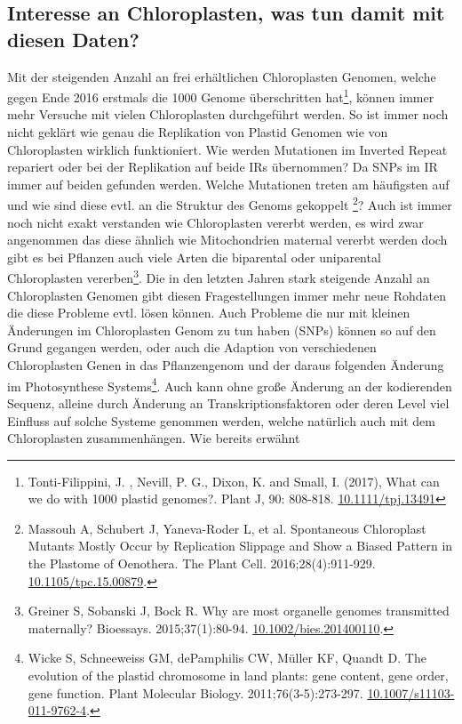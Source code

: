 \documentclass{scrartcl}
\begin{document}
\subsection{Interesse an Chloroplasten, was tun damit mit diesen Daten?}
\label{sec-2-6}
Mit der steigenden Anzahl an frei erhältlichen Chloroplasten Genomen, welche gegen Ende 2016 erstmals die 1000 Genome überschritten hat\footnote{Tonti-Filippini, J. , Nevill, P. G., Dixon, K. and Small, I. (2017), What can we do with 1000 plastid genomes?. Plant J, 90: 808-818. \url{10.1111/tpj.13491}}, können immer mehr Versuche mit vielen Chloroplasten durchgeführt werden.
So ist immer noch nicht geklärt wie genau die Replikation von Plastid Genomen wie von Chloroplasten wirklich funktioniert. Wie werden Mutationen im Inverted Repeat repariert oder bei der Replikation auf beide IRs übernommen?
Da SNPs im IR immer auf beiden gefunden werden. Welche Mutationen treten am häufigsten auf und wie sind diese evtl. an die Struktur des Genoms gekoppelt \footnote{Massouh A, Schubert J, Yaneva-Roder L, et al. Spontaneous Chloroplast Mutants Mostly Occur by Replication Slippage and Show a Biased Pattern in the Plastome of Oenothera. The Plant Cell. 2016;28(4):911-929. \url{10.1105/tpc.15.00879}.}? Auch ist immer noch nicht exakt verstanden wie Chloroplasten
vererbt werden, es wird zwar angenommen das diese ähnlich wie Mitochondrien maternal vererbt werden doch gibt es bei Pflanzen auch viele Arten die biparental oder uniparental Chloroplasten vererben\footnote{Greiner S, Sobanski J, Bock R. Why are most organelle genomes transmitted maternally? Bioessays. 2015;37(1):80-94. \url{10.1002/bies.201400110}.}. Die in den letzten 
Jahren stark steigende Anzahl an Chloroplasten Genomen gibt diesen Fragestellungen immer mehr neue Rohdaten die diese Probleme evtl. lösen können. Auch Probleme die nur mit kleinen Änderungen im Chloroplasten Genom zu tun 
haben (SNPs)
können so auf den Grund gegangen werden, oder auch die Adaption von verschiedenen Chloroplasten Genen in das Pflanzengenom und der daraus folgenden Änderung im Photosynthese Systems\footnote{Wicke S, Schneeweiss GM, dePamphilis CW, Müller KF, Quandt D. The evolution of the plastid chromosome in land plants: gene content, gene order, gene function. Plant Molecular Biology. 2011;76(3-5):273-297. \url{10.1007/s11103-011-9762-4}.}. Auch kann ohne große Änderung an der
kodierenden Sequenz, alleine durch Änderung an Transkriptionsfaktoren oder deren Level viel Einfluss auf solche Systeme genommen werden, welche natürlich auch mit dem Chloroplasten zusammenhängen\footnotemark[33]{}. Wie bereits erwähnt 
\end{document}
